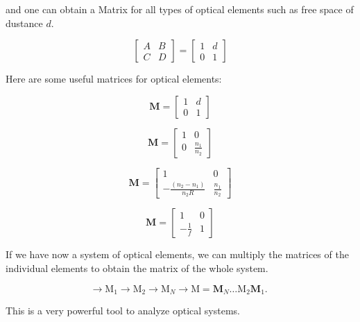 \documentclass[
  a4paper,
]{book}
\begin{document}
\begin{tcolorbox}
and one can obtain a Matrix for all types of optical elements such as
free space of dustance \(d\).

\[\begin{bmatrix}
A & B\\
C & D
\end{bmatrix}
=
\begin{bmatrix}
1 & d\\
0 & 1
\end{bmatrix}
\]

Here are some useful matrices for optical elements:

\[
\mathbf{M}=\left[\begin{array}{ll}
1 & d \\
0 & 1
\end{array}\right] \tag{Free space}
\]

\[
\mathbf{M}=\left[\begin{array}{cc}
1 & 0 \\
0 & \frac{n_1}{n_2}
\end{array}\right] \tag{Planar interface}
\]

\[
\mathbf{M}=\left[\begin{array}{cc}
1 & 0 \\
-\frac{\left(n_2-n_1\right)}{n_2 R} & \frac{n_1}{n_2}
\end{array}\right] \tag{Spherical Boundary}
\]

\[
\mathbf{M}=\left[\begin{array}{cc}
1 & 0 \\
-\frac{1}{f} & 1
\end{array}\right] \tag{Tin Lens}
\]

If we have now a system of optical elements, we can multiply the
matrices of the individual elements to obtain the matrix of the whole
system.

\[
\rightarrow \mathrm{M}_1 \rightarrow \mathrm{M}_2 \rightarrow \mathrm{M}_N \rightarrow \mathrm{M}=\mathbf{M}_N \ldots \mathrm{M}_2 \mathbf{M}_1 \text {. }
\]

This is a very powerful tool to analyze optical systems.

\end{tcolorbox}
\end{document}
